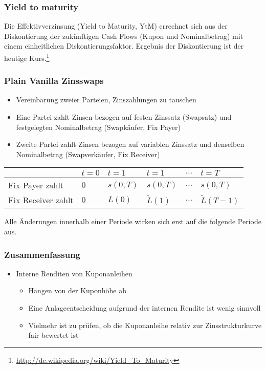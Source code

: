 \subsubsection{Yield to maturity}
Die Effektivverzinsung (Yield to Maturity, YtM) errechnet sich aus der Diskontierung der zukünftigen Cash Flows (Kupon und Nominalbetrag) mit einem einheitlichen Diskontierungsfaktor. Ergebnis der Diskontierung ist der heutige Kurs.\footnote{\url{http://de.wikipedia.org/wiki/Yield_To_Maturity}}

\subsubsection{Plain Vanilla Zinsswaps}
\begin{itemize}
	\item Vereinbarung zweier Parteien, Zinszahlungen zu tauschen
	\item Eine Partei zahlt Zinsen bezogen auf festen Zinssatz (Swapsatz) und festgelegten Nominalbetrag (Swapkäufer, Fix Payer)
	\item Zweite Partei zahlt Zinsen bezogen auf variablen Zinssatz und denselben Nominalbetrag (Swapverkäufer, Fix Receiver)
\end{itemize}

\begin{tabularx}{\columnwidth}{l|X|X|X|c|l}
						& \(t=0\) 	& \(t=1\)		& \(t=1\)			& \(\dots\) 	& \(t=T\) \\
	\hline
	Fix Payer zahlt 	& \(0\)		& \(s(0,T)\)	& \(s(0,T)\)		& \(\dots\)		& \(s(0,T)\) \\
	Fix Receiver zahlt 	& \(0\)		& \(L(0)\)		& \(\tilde{L}(1)\)	& \(\dots\)		& \(\tilde{L}(T-1)\)
\end{tabularx}

Alle Änderungen innerhalb einer Periode wirken sich erst auf die folgende Periode aus.

\subsubsection{Zusammenfassung}
\begin{itemize}
	\item Interne Renditen von Kuponanleihen
	\begin{itemize}
		\item Hängen von der Kuponhöhe ab
		\item Eine Anlageentscheidung aufgrund der internen Rendite ist wenig sinnvoll
		\item Vielmehr ist zu prüfen, ob die Kuponanleihe relativ zur Zinsstrukturkurve fair bewertet ist
	\end{itemize}
\end{itemize}


